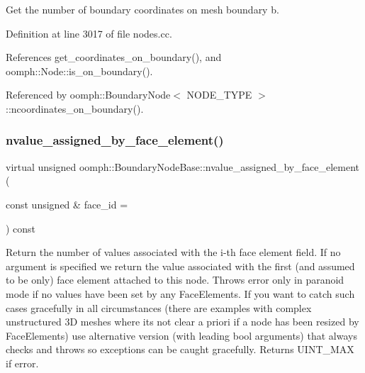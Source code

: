 Get the number of boundary coordinates on mesh boundary b. 



Definition at line 3017 of file nodes.\+cc.



References get\+\_\+coordinates\+\_\+on\+\_\+boundary(), and oomph\+::\+Node\+::is\+\_\+on\+\_\+boundary().



Referenced by oomph\+::\+Boundary\+Node$<$ N\+O\+D\+E\+\_\+\+T\+Y\+P\+E $>$\+::ncoordinates\+\_\+on\+\_\+boundary().

\mbox{\label{classoomph_1_1BoundaryNodeBase_ae0d9f15e311861a09073ee01e5fb5cd2}} 
\subsubsection{\texorpdfstring{nvalue\+\_\+assigned\+\_\+by\+\_\+face\+\_\+element()}{nvalue\_assigned\_by\_face\_element()}}
{\footnotesize\ttfamily virtual unsigned oomph\+::\+Boundary\+Node\+Base\+::nvalue\+\_\+assigned\+\_\+by\+\_\+face\+\_\+element (\begin{DoxyParamCaption}\item[{const unsigned \&}]{face\+\_\+id = {} }\end{DoxyParamCaption}) const\hspace{0.3cm}{\ttfamily [pure virtual]}}



Return the number of values associated with the i-\/th face element field. If no argument is specified we return the value associated with the first (and assumed to be only) face element attached to this node. Throws error only in paranoid mode if no values have been set by any Face\+Elements. If you want to catch such cases gracefully in all circumstances (there are examples with complex unstructured 3D meshes where it\textquotesingle{}s not clear a priori if a node has been resized by Face\+Elements) use alternative version (with leading bool arguments) that always checks and throws so exceptions can be caught gracefully. Returns U\+I\+N\+T\+\_\+\+M\+AX if error. 



